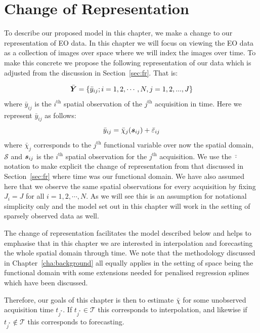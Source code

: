 \section{Change of Representation \label{sec:representation}}
To describe our proposed model in this chapter, we make a change to our representation of EO data.
In this chapter we will focus on viewing the EO data as a collection of images over space where we will index the images over time.
To make this concrete we propose the following representation of our data which is adjusted from the discussion in Section~\ref{sec:fr}.
That is: 

\begin{equation}
	\bar{\bm{{Y}}} = \{ \bar{y}_{ij}; i=1, 2, \cdots, N, j = 1, 2, ... ,J\}
\end{equation}
where $\bar{y}_{ij}$ is the $i^\text{th}$ spatial observation of the $j^\text{th}$ acquisition in time.
Here we represent $\bar{y}_{ij}$ as follows:
\begin{equation}
	\bar{y}_{ij} = \bar{\chi}_j(\bm{{s}}_{ij})  + \bar{\varepsilon}_{ij}
	\label{eqn:space_obs}
\end{equation}
where $\bar{\chi}_j$ corresponds to the $j^\text{th}$  functional variable over now the spatial domain, $\mathcal{S}$ and $\bm{{s}}_{ij}$ is the $i^\text{th}$ spatial observation for the $j^\text{th}$ acquisition.
We use the $\bar{\cdot}$ notation to make explicit the change of representation from that discussed in Section~\ref{sec:fr} where time was our functional domain.
We have also assumed here that we observe the same spatial observations for every acquisition by fixing $J_i = J$ for all $i=1, 2, \cdots, N$.
As we will see this is an assumption for notational simplicity only and the model set out in this chapter will work in the setting of sparsely observed data as well. 

The change of representation facilitates the model described below and helps to emphasise that in this chapter we are interested in interpolation and forecasting the whole spatial domain through time.
We note that the methodology discussed in Chapter~\ref{cha:background} all equally applies in the setting of space being the functional domain with some extensions needed for penalised regression splines which have been discussed.

Therefore, our goals of this chapter is then to estimate $\bar{\chi}$ for some unobserved acquisition time $t_{j^*}$.
If $t_{j^*} \in \mathcal{T}$ this corresponds to interpolation, and likewise if $t_{j^*} \not \in \mathcal{T}$ this corresponds to forecasting.

